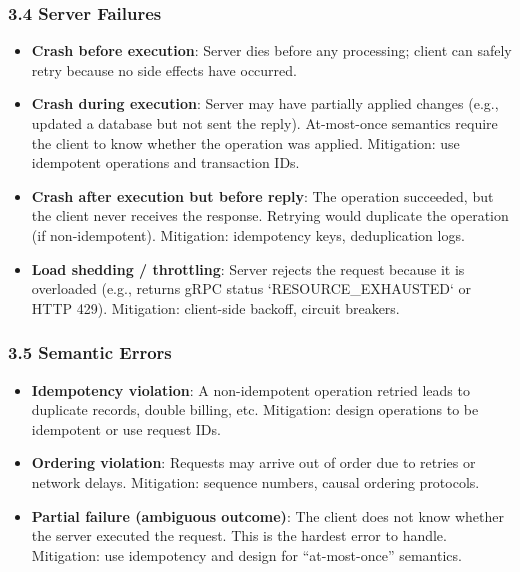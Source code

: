 \documentclass[10pt,a4paper]{article}
\begin{document}
\subsubsection{3.4 Server Failures}
\begin{itemize}
    \item \textbf{Crash before execution}: Server dies before any processing; client can safely retry because no side effects have occurred.
    \item \textbf{Crash during execution}: Server may have partially applied changes (e.g., updated a database but not sent the reply). At-most-once semantics require the client to know whether the operation was applied. Mitigation: use idempotent operations and transaction IDs.
    \item \textbf{Crash after execution but before reply}: The operation succeeded, but the client never receives the response. Retrying would duplicate the operation (if non-idempotent). Mitigation: idempotency keys, deduplication logs.
    \item \textbf{Load shedding / throttling}: Server rejects the request because it is overloaded (e.g., returns gRPC status `RESOURCE\_EXHAUSTED` or HTTP 429). Mitigation: client-side backoff, circuit breakers.
\end{itemize}

\subsubsection{3.5 Semantic Errors}
\begin{itemize}
    \item \textbf{Idempotency violation}: A non-idempotent operation retried leads to duplicate records, double billing, etc. Mitigation: design operations to be idempotent or use request IDs.
    \item \textbf{Ordering violation}: Requests may arrive out of order due to retries or network delays. Mitigation: sequence numbers, causal ordering protocols.
    \item \textbf{Partial failure (ambiguous outcome)}: The client does not know whether the server executed the request. This is the hardest error to handle. Mitigation: use idempotency and design for “at-most-once” semantics.
\end{itemize}
\end{document}
